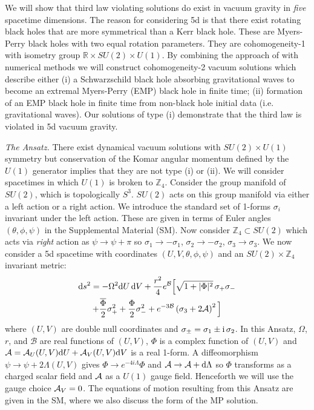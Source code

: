 \documentclass[prl,twocolumn,superscriptaddress,nofootinbib]{revtex4-2}
\begin{document}
We will show that third law violating solutions do exist in vacuum gravity in {\it five} spacetime dimensions. The reason for considering 5d is that there exist rotating black holes that are more symmetrical than a Kerr black hole. These are Myers-Perry black holes \cite{Myers:1986un} with two equal rotation parameters. They are cohomogeneity-1 with isometry group $\mathbb{R} \times SU(2) \times U(1)$. By combining the approach of \cite{Kehle:2022uvc} with numerical methods we will construct cohomogeneity-2 vacuum solutions which describe either (i) a Schwarzschild black hole absorbing gravitational waves to become an extremal Myers-Perry (EMP) black hole in finite time; (ii) formation of an EMP black hole in finite time from non-black hole initial data (i.e. gravitational waves). Our solutions of type (i) demonstrate that the third law is violated in 5d vacuum gravity.

{\it The Ansatz.} There exist dynamical vacuum solutions with $SU(2) \times U(1)$ symmetry \cite{Bizon:2005cp,Dafermos:2005nh} but conservation of the Komar angular momentum defined by the $U(1)$ generator implies that they are not type (i) or (ii). We will consider spacetimes in which $U(1)$ is broken to $\mathbb{Z}_4$. Consider the group manifold of $SU(2)$, which is topologically $S^3$. $SU(2)$ acts on this group manifold via either a left action or a right action. We introduce the standard set of 1-forms $\sigma_i$ invariant under the left action. These are given in terms of Euler angles $(\theta,\phi,\psi)$ in the Supplemental Material (SM). Now consider $\mathbb{Z}_4 \subset SU(2)$ which acts via {\it right} action as $\psi \rightarrow \psi + \pi$ so $\sigma_1 \rightarrow  -\sigma_1$, $\sigma_2 \rightarrow -\sigma_2$, $\sigma_3 \rightarrow \sigma_3$. We now consider a 5d spacetime with coordinates $(U,V,\theta,\phi,\psi)$ and an $SU(2) \times \mathbb{Z}_4$ invariant metric:
 \begin{multline}
{\rm d}s^2=-\Omega^2{\rm d}U\,{\rm d}V+\frac{r^2}{4}e^{\mathcal{B}}\Big[\sqrt{1+|\Phi|^2}\,\sigma_+ \sigma_-
\\
+\frac{\overline{\Phi}}{2}\sigma_+^2+\frac{\Phi}{2} \sigma_-^2+e^{-3\mathcal{B}}\left(\sigma_3+2 \mathcal{A}\right)^2\Big]
\label{eq:doublenull}
\end{multline}
where $(U,V)$ are double null coordinates and $\sigma_\pm = \sigma_1 \pm {\rm i}\,\sigma_2$. In this Ansatz, $\Omega$, $r$, and $\mathcal{B}$ are real functions of $(U,V)$, $\Phi$ is a complex function of $(U,V)$ and ${\cal A}={\cal A}_U (U,V){\rm d}U + {\cal A}_V (U,V) {\rm d}V$ is a real 1-form. A diffeomorphism $\psi \rightarrow \psi + 2\Lambda (U,V)$ gives $\Phi \rightarrow e^{-4i\Lambda} \Phi$ and $\mathcal{A} \rightarrow \mathcal{A} + {\rm d}\Lambda$ so $\Phi$ transforms as a charged scalar field and ${\cal A}$ as a $U(1)$ gauge field. Henceforth we will use the gauge choice ${\cal A}_V=0$. The equations of motion resulting from this Ansatz are given in the SM, where we also discuss the form of the MP solution.
\end{document}
